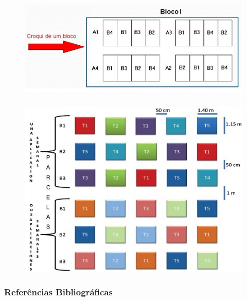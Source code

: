 \documentclass[14pt,aspectratio=1610]{beamer}
\begin{document}

\begin{frame}{}
\frametitle{}
\begin{block}{}
\begin{figure}[H]
    \centering
    \includegraphics[scale=0.5]{Figuras/Fig5}
  \end{figure}
\end{block}
\end{frame}

\begin{frame}{}
\frametitle{}
\begin{block}{}
\begin{figure}[H]
    \centering
    \includegraphics[scale=0.3]{Figuras/Fig6}
  \end{figure}
\end{block}
\end{frame}

\begin{frame}[allowframebreaks]
\frametitle{Referências Bibliográficas}

\end{frame}
\end{document}

